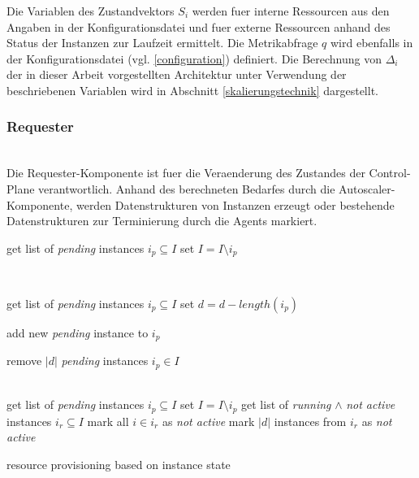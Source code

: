\documentclass[runningheads]{llncs}
\begin{document}
Die Variablen des Zustandvektors $S_{i}$ werden fuer interne Ressourcen aus den Angaben in der Konfigurationsdatei und fuer externe Ressourcen anhand des Status der Instanzen zur Laufzeit ermittelt. Die Metrikabfrage $q$ wird ebenfalls in der Konfigurationsdatei (vgl. \ref{configuration}) definiert. Die Berechnung von $\Delta _{i}$ der in dieser Arbeit vorgestellten Architektur unter Verwendung der beschriebenen Variablen wird in Abschnitt \ref{skalierungstechnik} dargestellt. 
	
\subsubsection{Requester}  \hfill\\

Die Requester-Komponente ist fuer die Veraenderung des Zustandes der Control-Plane verantwortlich. Anhand des berechneten Bedarfes durch die Autoscaler-Komponente, werden Datenstrukturen von Instanzen erzeugt oder bestehende Datenstrukturen zur Terminierung durch die Agents markiert.

\begin{algorithm}[H]
	\DontPrintSemicolon
	{
		get list of \textit{pending} instances $i_{p} \subseteq I$ \;
		set $I = I \setminus i_{p}$ \;
	}
	
	\texttt{\\}
	{
		get list of \textit{pending} instances $i_{p} \subseteq I$ \;
		set $d = d - length(i_{p})$ \;
		
		{
			
			{
				add new \textit{pending} instance to  $i_{p}$
			}
			
		}
	
		{
			remove $|d|$ \textit{pending} instances $i_{p} \in I$
		}
	}
	
	\texttt{\\}
	{
		get list of \textit{pending} instances $i_{p} \subseteq I$ \;
		set $I = I \setminus i_{p}$ \;
		get list of \textit{running} $\wedge$ \textit{not active} instances $i_{r} \subseteq I$ \;
		{
			mark all $i \in i_{r}$ as \textit{not active}
		}
		\Else 
		{
			mark $|d|$ instances from $i_{r}$ as \textit{not active}
		}
	}
	
	\caption{resource provisioning based on instance state}
	\label{fig:requester_algorithm}
\end{algorithm}
\end{document}
